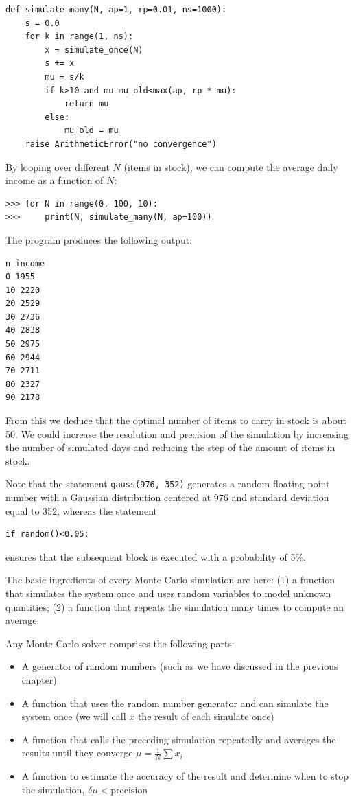 \documentclass[justified, sixbynine]{tufte-book}
\def\ft{\small\tt}
\theoremstyle{plain}%
\newtheorem * {corollary}{Corollary}
\theoremstyle{definition}
\theoremstyle{remark}
\newtheorem * {remark}{Remark}
\newtheorem * {note}{Note}
\begin{document}
\begin{fullwidth}
\begin{lstlisting}
def simulate_many(N, ap=1, rp=0.01, ns=1000):
    s = 0.0
    for k in range(1, ns):
        x = simulate_once(N)
        s += x
        mu = s/k
        if k>10 and mu-mu_old<max(ap, rp * mu):
            return mu
        else:
            mu_old = mu
    raise ArithmeticError("no convergence")
\end{lstlisting}

By looping over different $N$ (items in stock), we can compute the average daily income as a function of $N$:
\begin{lstlisting}
>>> for N in range(0, 100, 10):
>>>     print(N, simulate_many(N, ap=100))
\end{lstlisting}

The program produces the following output:
\begin{lstlisting}
n income
0 1955
10 2220
20 2529
30 2736
40 2838
50 2975
60 2944
70 2711
80 2327
90 2178
\end{lstlisting}

From this we deduce that the optimal number of items to carry in stock is
about 50. We could increase the resolution and precision of the simulation
by increasing the number of simulated days and reducing the step of the
amount of items in stock.

Note that the statement {\ft gauss(976, 352)} generates a random floating
point number with a Gaussian distribution centered at 976 and standard
deviation equal to 352, whereas the statement
\begin{lstlisting}
if random()<0.05:
\end{lstlisting}

ensures that the subsequent block is executed with a probability of 5\%.

The basic ingredients of every Monte Carlo simulation are here: (1) a function that simulates the system once and uses random variables to model unknown quantities; (2) a function that repeats the simulation many times to compute an average.

Any Monte Carlo solver comprises the following parts:

\begin{itemize}
\item A generator of random numbers (such as we have discussed in the previous chapter)
\item A function that uses the random number generator and can simulate the system once (we will call $x$ the result of each simulate once)
\item A function that calls the preceding simulation repeatedly and averages the results until they converge $\mu = \frac1N \sum x_i$
\item A function to estimate the accuracy of the result and determine when to stop the simulation, $\delta\mu < \textrm{precision}$
\end{itemize}


\end{fullwidth}
\end{document}
